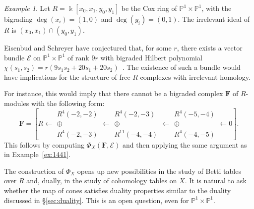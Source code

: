 \documentclass[12pt]{amsart}
\theoremstyle{definition}
\theoremstyle{remark}
\newtheorem{example}[lemma]{Example}
\newcommand{\kk}{\Bbbk}
\newcommand{\PP}{\mathbb{P}}
\newcommand{\cE}{\mathcal{E}}
\newcommand{\FF}{\mathbf{F}}
\begin{document}
\begin{example}
Let $R=\kk[x_0,x_1,y_0,y_1]$ be the Cox ring of $\PP^1\times \PP^1$, with the bigrading $\deg(x_i)=(1,0)$ and $\deg(y_i)=(0,1)$.  The irrelevant ideal of $R$ is $(x_0,x_1)\cap (y_0,y_1)$.  

Eisenbud and Schreyer have conjectured that, for some $r$, there exists a vector bundle $\cE$ on $\PP^1\times \PP^1$ of rank $9r$ with bigraded Hilbert polynomial $\chi(s_1,s_2)=r(9s_1s_2+20s_1+20s_2)$~\cite[Conjecture 2]{eis-schrey-abel}.  The existence of such a bundle would have implications for the structure of free $R$-complexes with irrelevant homology.  

For instance, this would imply that there cannot be a bigraded complex $\FF$ of $R$-modules with the following form:
\[
\FF
=\left[
R\gets 
\begin{matrix}
R^4(-2,-2)
\\
\oplus
\\
R^4(-2,-3)
\end{matrix}
\gets
\begin{matrix}
R^4(-2,-3)
\\
\oplus
\\
R^{11}(-4,-4)
\end{matrix}
\gets
\begin{matrix}
R^4(-5,-4)
\\
\oplus
\\
R^4(-4,-5)
\end{matrix}
\gets
0
\right].
\]
This follows by computing $\Phi_X(\FF, \cE)$ and then applying the same argument as in Example~\ref{ex:1441}.
\end{example}


The construction of $\Phi_X$ opens up new possibilities in the study of Betti tables over $R$ and, dually, in the study of cohomology tables on $X$.  
It is natural to ask whether
the map of cones satisfies duality properties similar to the duality discussed in \S\ref{sec:duality}.  This is an open question, even for $\PP^1\times \PP^1$.
\end{document}
